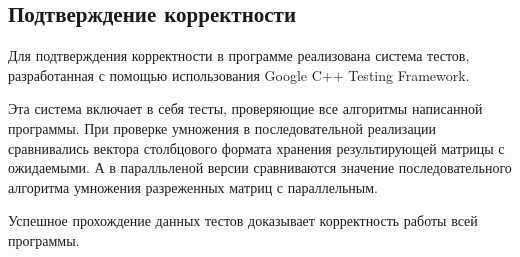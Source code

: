 \documentclass{report}
\begin{document}
\begin{center}
\section*{Подтверждение корректности}
\end{center}
\par Для подтверждения корректности в программе реализована система тестов, разработанная с помощью использования Google C++ Testing Framework.
\par Эта система включает в себя тесты, проверяющие все алгоритмы написанной программы. При проверке умножения в последовательной реализации сравнивались вектора столбцового формата хранения результирующей матрицы с ожидаемыми. А в паралльленой версии сравниваются значение последовательного алгоритма умножения разреженных матриц с параллельным.
\par Успешное прохождение данных тестов доказывает корректность работы всей программы.
\newpage
\end{document}
